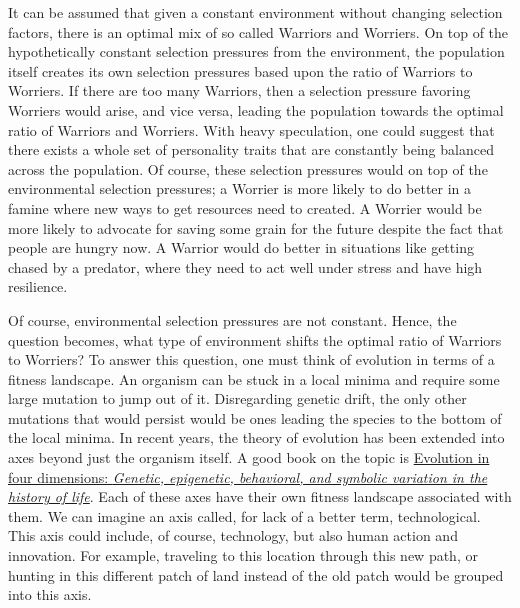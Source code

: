 \documentclass[letterpaper]{article}
\begin{document}
It can be assumed that given a constant environment without changing
selection factors, there is an optimal mix of so called Warriors and
Worriers. On top of the hypothetically constant selection pressures from
the environment, the population itself creates its own selection
pressures based upon the ratio of Warriors to Worriers. If there are too
many Warriors, then a selection pressure favoring Worriers would arise,
and vice versa, leading the population towards the optimal ratio of
Warriors and Worriers. With heavy speculation, one could suggest that
there exists a whole set of personality traits that are constantly being
balanced across the population. Of course, these selection pressures
would on top of the environmental selection pressures; a Worrier is more
likely to do better in a famine where new ways to get resources need to
created. A Worrier would be more likely to advocate for saving some
grain for the future despite the fact that people are hungry now. A
Warrior would do better in situations like getting chased by a predator,
where they need to act well under stress and have high resilience.

Of course, environmental selection pressures are not constant. Hence,
the question becomes, what type of environment shifts the optimal ratio
of Warriors to Worriers? To answer this question, one must think of
evolution in terms of a fitness landscape. An organism can be stuck in a
local minima and require some large mutation to jump out of it.
Disregarding genetic drift, the only other mutations that would persist
would be ones leading the species to the bottom of the local minima. In
recent years, the theory of evolution has been extended into axes beyond
just the organism itself. A good book on the topic is
\href{https://www.ncbi.nlm.nih.gov/pmc/articles/PMC1265888/}{Evolution in
four dimensions: \emph{Genetic, epigenetic, behavioral, and symbolic
variation in the history of life}}. Each of these axes have their own
fitness landscape associated with them. We can imagine an axis called,
for lack of a better term, technological. This axis could include, of
course, technology, but also human action and innovation. For example,
traveling to this location through this new path, or hunting in this
different patch of land instead of the old patch would be grouped into
this axis.
\end{document}
